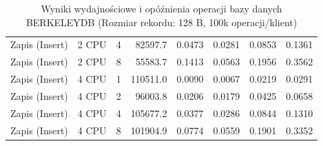 \begin{table}[ht]
{\begin{tabular}{llcrrrrr}
Zapis (Insert) & 2 CPU & 4 & 82597.7 & 0.0473 & 0.0281 & 0.0853 & 0.1361 \\
Zapis (Insert) & 2 CPU & 8 & 55583.7 & 0.1413 & 0.0563 & 0.1956 & 0.3562 \\
Zapis (Insert) & 4 CPU & 1 & 110511.0 & 0.0090 & 0.0067 & 0.0219 & 0.0291 \\
Zapis (Insert) & 4 CPU & 2 & 96003.8 & 0.0206 & 0.0179 & 0.0425 & 0.0658 \\
Zapis (Insert) & 4 CPU & 4 & 105677.2 & 0.0377 & 0.0286 & 0.0844 & 0.1310 \\
Zapis (Insert) & 4 CPU & 8 & 101904.9 & 0.0774 & 0.0559 & 0.1901 & 0.3352 \\
\bottomrule
\end{tabular}%
}
\caption{Wyniki wydajnościowe i opóźnienia operacji bazy danych BERKELEYDB (Rozmiar rekordu: 128 B, 100k operacji/klient)}
\label{tab:latency_berkeleydb_small_100000}
\end{table}
